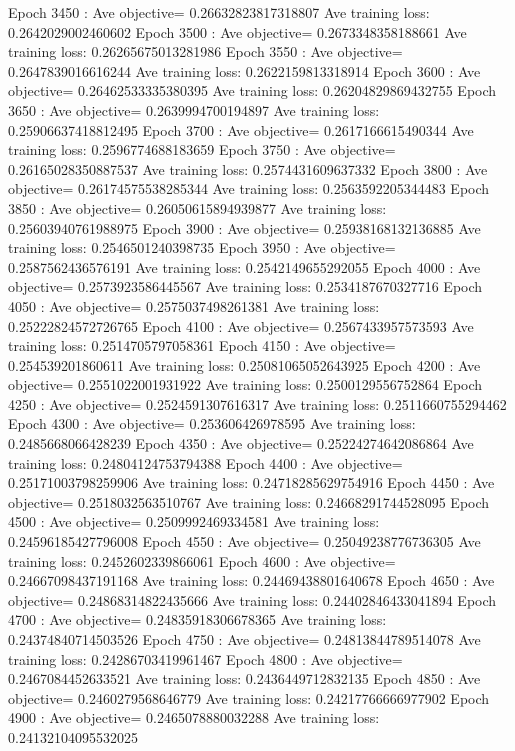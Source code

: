 \documentclass{article}
\theoremstyle{plain}
\theoremstyle{definition}
\begin{document}
\begin{enumerate}
Epoch  3450 : Ave objective= 0.26632823817318807  Ave training loss:  0.2642029002460602
Epoch  3500 : Ave objective= 0.2673348358188661  Ave training loss:  0.26265675013281986
Epoch  3550 : Ave objective= 0.2647839016616244  Ave training loss:  0.2622159813318914
Epoch  3600 : Ave objective= 0.26462533335380395  Ave training loss:  0.26204829869432755
Epoch  3650 : Ave objective= 0.2639994700194897  Ave training loss:  0.25906637418812495
Epoch  3700 : Ave objective= 0.2617166615490344  Ave training loss:  0.2596774688183659
Epoch  3750 : Ave objective= 0.26165028350887537  Ave training loss:  0.2574431609637332
Epoch  3800 : Ave objective= 0.26174575538285344  Ave training loss:  0.2563592205344483
Epoch  3850 : Ave objective= 0.26050615894939877  Ave training loss:  0.25603940761988975
Epoch  3900 : Ave objective= 0.25938168132136885  Ave training loss:  0.2546501240398735
Epoch  3950 : Ave objective= 0.2587562436576191  Ave training loss:  0.2542149655292055
Epoch  4000 : Ave objective= 0.2573923586445567  Ave training loss:  0.2534187670327716
Epoch  4050 : Ave objective= 0.2575037498261381  Ave training loss:  0.25222824572726765
Epoch  4100 : Ave objective= 0.2567433957573593  Ave training loss:  0.2514705797058361
Epoch  4150 : Ave objective= 0.254539201860611  Ave training loss:  0.25081065052643925
Epoch  4200 : Ave objective= 0.2551022001931922  Ave training loss:  0.2500129556752864
Epoch  4250 : Ave objective= 0.2524591307616317  Ave training loss:  0.2511660755294462
Epoch  4300 : Ave objective= 0.253606426978595  Ave training loss:  0.2485668066428239
Epoch  4350 : Ave objective= 0.25224274642086864  Ave training loss:  0.24804124753794388
Epoch  4400 : Ave objective= 0.25171003798259906  Ave training loss:  0.24718285629754916
Epoch  4450 : Ave objective= 0.2518032563510767  Ave training loss:  0.24668291744528095
Epoch  4500 : Ave objective= 0.2509992469334581  Ave training loss:  0.24596185427796008
Epoch  4550 : Ave objective= 0.25049238776736305  Ave training loss:  0.2452602339866061
Epoch  4600 : Ave objective= 0.24667098437191168  Ave training loss:  0.24469438801640678
Epoch  4650 : Ave objective= 0.24868314822435666  Ave training loss:  0.24402846433041894
Epoch  4700 : Ave objective= 0.24835918306678365  Ave training loss:  0.24374840714503526
Epoch  4750 : Ave objective= 0.24813844789514078  Ave training loss:  0.24286703419961467
Epoch  4800 : Ave objective= 0.2467084452633521  Ave training loss:  0.2436449712832135
Epoch  4850 : Ave objective= 0.2460279568646779  Ave training loss:  0.24217766666977902
Epoch  4900 : Ave objective= 0.2465078880032288  Ave training loss:  0.24132104095532025

\end{enumerate}
\end{document}
